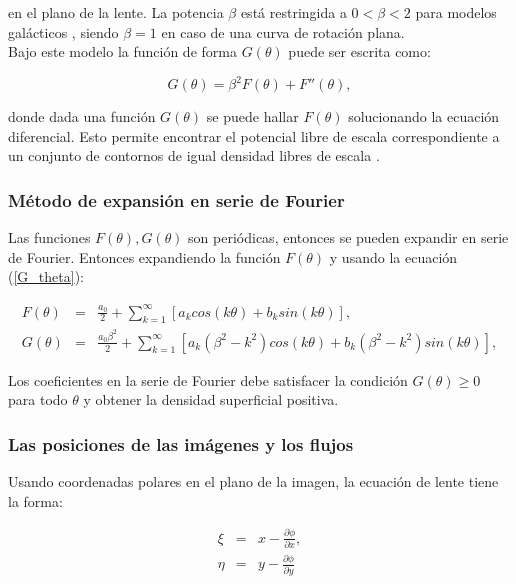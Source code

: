 en el plano de la lente. La potencia $\beta$ está restringida a $0<\beta<2$ para modelos galácticos , siendo $\beta=1$ en caso de una curva de rotación plana.\\

Bajo este modelo la función de forma $G(\theta)$ puede ser escrita como:

\begin{equation}
\label{G_theta}
G(\theta) = \beta^2 F(\theta) + F''(\theta), 
\end{equation}

donde dada una función $G(\theta)$ se puede hallar $F(\theta)$ solucionando la ecuación diferencial. Esto permite encontrar el potencial libre de escala correspondiente a un conjunto de contornos de igual densidad libres de escala \cite{EV03}.


\subsubsection{Método de expansión en serie de Fourier}

Las funciones $F(\theta), G(\theta)$ son periódicas, entonces se pueden expandir en serie de Fourier. Entonces expandiendo la función $F(\theta)$ y usando la ecuación (\ref{G_theta}):

\begin{eqnarray}
\label{Fourier_F}
F(\theta) &=& \frac{a_0}{2} + \sum_{k=1}^{\infty} \left[ a_k cos(k \theta) + b_k sin (k \theta) \right],\\
G(\theta) &=& \frac{a_0 \beta^2}{2} + \sum_{k=1}^{\infty} \left[ a_k (\beta^2-k^2) cos(k \theta) + b_k (\beta^2-k^2) sin (k \theta) \right],
\end{eqnarray}

Los coeficientes en la serie de Fourier debe satisfacer la condición $G(\theta) \geq 0$ para todo $\theta$ y obtener la densidad superficial positiva. 

\subsubsection{Las posiciones de las imágenes y los flujos}

Usando coordenadas polares en el plano de la imagen, la ecuación de lente tiene la forma:

\begin{eqnarray}
\xi & = & x - \frac{\partial \phi}{\partial x}, \\
\eta & = &  y - \frac{\partial \phi}{\partial y}
\end{eqnarray}



